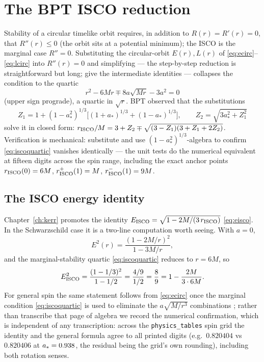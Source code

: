\section{The BPT ISCO reduction}
\label{app:isco}

Stability of a circular timelike orbit requires, in addition to
$R(r) = R'(r) = 0$, that $R''(r) \le 0$ (the orbit sits at a potential
minimum); the ISCO is the marginal case $R'' = 0$. Substituting the
circular-orbit $E(r), L(r)$ of \eqref{eq:ecirc}--\eqref{eq:lcirc} into
$R''(r) = 0$ and simplifying — the step-by-step reduction is
straightforward but long; \citet{BardeenPressTeukolsky1972} give the
intermediate identities — collapses the condition to the quartic
\begin{equation}
r^2 - 6Mr \mp 8a\sqrt{Mr} - 3a^2 = 0
\label{eq:iscoquartic}
\end{equation}
(upper sign prograde), a quartic in $\sqrt r$. BPT observed that the
substitutions
\begin{equation}
Z_1 = 1 + (1-a_*^2)^{1/3}\bigl[(1+a_*)^{1/3} + (1-a_*)^{1/3}\bigr],
\qquad
Z_2 = \sqrt{3a_*^2 + Z_1^2}
\end{equation}
solve it in closed form:
$r_{\rm ISCO}/M = 3 + Z_2 \mp \sqrt{(3-Z_1)(3+Z_1+2Z_2)}$. Verification
is mechanical: substitute and use
$(1-a_*^2)^{1/3}$-algebra to confirm \eqref{eq:iscoquartic} vanishes
identically — the unit tests do the numerical equivalent at fifteen
digits across the spin range, including the exact anchor points
$r_{\rm ISCO}(0) = 6M$, $r_{\rm ISCO}^{+}(1) = M$,
$r_{\rm ISCO}^{-}(1) = 9M$.

\subsection{The ISCO energy identity}
\label{app:eisco}

Chapter~\ref{ch:kerr} promotes the identity
$E_{\rm ISCO} = \sqrt{1 - 2M/(3\,r_{\rm ISCO})}$
\eqref{eq:eisco}. In the Schwarzschild case it is a two-line
computation worth seeing. With $a = 0$,
\begin{equation}
E^2(r) = \frac{(1 - 2M/r)^2}{1 - 3M/r},
\end{equation}
and the marginal-stability quartic \eqref{eq:iscoquartic} reduces to
$r = 6M$, so
\begin{equation}
E^2_{\rm ISCO} = \frac{(1 - 1/3)^2}{1 - 1/2} = \frac{4/9}{1/2}
= \frac{8}{9} = 1 - \frac{2M}{3\cdot 6M} .
\end{equation}
For general spin the same statement follows from
\eqref{eq:ecirc} once the marginal condition \eqref{eq:iscoquartic} is
used to eliminate the $a\sqrt{M/r^3}$ combinations
\citep[the intermediate identities are eqs.~2.12--2.21
of][]{BardeenPressTeukolsky1972}; rather than transcribe that page of
algebra we record the numerical confirmation, which is independent of
any transcription: across the \texttt{physics\_tables} spin grid the
identity and the general formula agree to all printed digits (e.g.\
$0.820404$ vs $0.820406$ at $a_* = 0.938$, the residual being the
grid's own rounding), including both rotation senses.

